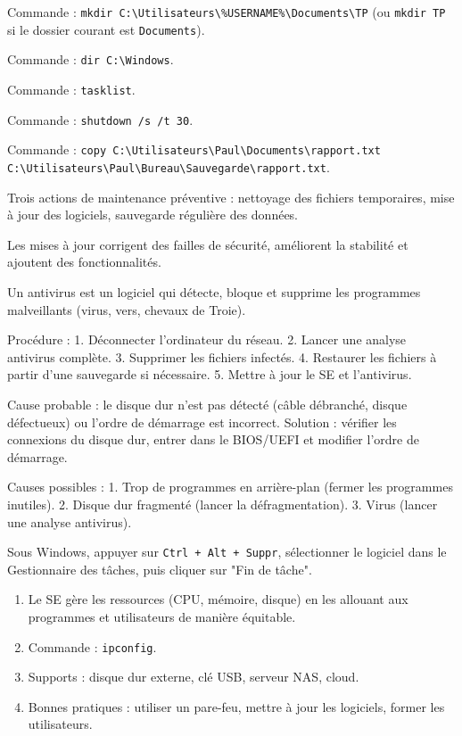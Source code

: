 Commande : \texttt{mkdir C:\textbackslash Utilisateurs\textbackslash \%USERNAME\%\textbackslash Documents\textbackslash TP} (ou \texttt{mkdir TP} si le dossier courant est \texttt{Documents}).

Commande : \texttt{dir C:\textbackslash Windows}.

Commande : \texttt{tasklist}.

Commande : \texttt{shutdown /s /t 30}.

Commande : \texttt{copy C:\textbackslash Utilisateurs\textbackslash Paul\textbackslash Documents\textbackslash rapport.txt C:\textbackslash Utilisateurs\textbackslash Paul\textbackslash Bureau\textbackslash Sauvegarde\textbackslash rapport.txt}.

Trois actions de maintenance préventive : nettoyage des fichiers temporaires, mise à jour des logiciels, sauvegarde régulière des données.

Les mises à jour corrigent des failles de sécurité, améliorent la stabilité et ajoutent des fonctionnalités.

Un antivirus est un logiciel qui détecte, bloque et supprime les programmes malveillants (virus, vers, chevaux de Troie).

Procédure : 1. Déconnecter l'ordinateur du réseau. 2. Lancer une analyse antivirus complète. 3. Supprimer les fichiers infectés. 4. Restaurer les fichiers à partir d'une sauvegarde si nécessaire. 5. Mettre à jour le SE et l'antivirus.

Cause probable : le disque dur n'est pas détecté (câble débranché, disque défectueux) ou l'ordre de démarrage est incorrect. Solution : vérifier les connexions du disque dur, entrer dans le BIOS/UEFI et modifier l'ordre de démarrage.

Causes possibles : 1. Trop de programmes en arrière-plan (fermer les programmes inutiles). 2. Disque dur fragmenté (lancer la défragmentation). 3. Virus (lancer une analyse antivirus).

Sous Windows, appuyer sur \texttt{Ctrl + Alt + Suppr}, sélectionner le logiciel dans le Gestionnaire des tâches, puis cliquer sur "Fin de tâche".

\begin{enumerate}
    \item Le SE gère les ressources (CPU, mémoire, disque) en les allouant aux programmes et utilisateurs de manière équitable.
    \item Commande : \texttt{ipconfig}.
    \item Supports : disque dur externe, clé USB, serveur NAS, cloud.
    \item Bonnes pratiques : utiliser un pare-feu, mettre à jour les logiciels, former les utilisateurs.
\end{enumerate}

